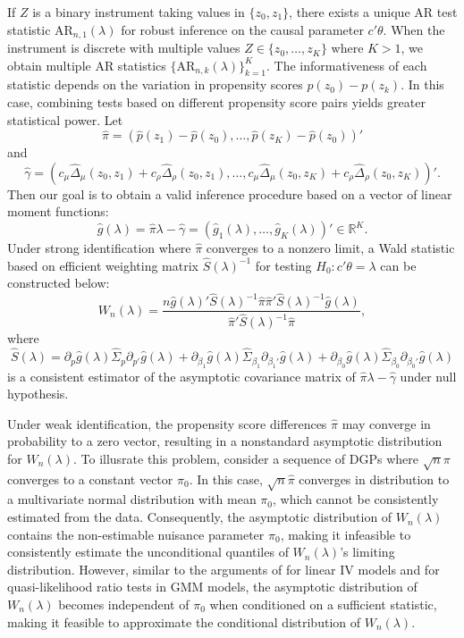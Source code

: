 \documentclass[11pt]{article}
\theoremstyle{definition}
\newcommand{\R}{\ensuremath{\mathbb{R}}}
\newcommand{\0}{\ensuremath{\mathbf{0}}}
\begin{document}
\begin{bibunit}
If $Z$ is a binary instrument taking values in $\{z_0, z_1\}$, there exists a unique AR test statistic $\text{AR}_{n,1}(\lambda)$ for robust inference on the causal parameter $c'\theta$. When the instrument is discrete with multiple values $Z\in\{z_0, \ldots, z_K\}$ where $K > 1$, we obtain multiple AR statistics $\{\text{AR}_{n,k}(\lambda)\}_{k=1}^K$. The informativeness of each statistic depends on the variation in propensity scores $p(z_0) - p(z_k)$. In this case, combining tests based on different propensity score pairs yields greater statistical power. Let 
\[
    \hat{\pi} = (\hat{p}(z_1) - \hat{p}(z_0), \ldots, \hat{p}(z_K) - \hat{p}(z_0))'
\]
and
\[
   \hat{\gamma} = (c_\mu \hat{\Delta}_\mu(z_0, z_1) + c_\rho \hat{\Delta}_\rho (z_0, z_1), \ldots, c_\mu \hat{\Delta}_\mu(z_0, z_K) + c_\rho \hat{\Delta}_\rho (z_0, z_K))'.
\]
Then our goal is to obtain a valid inference procedure based on a vector of linear moment functions: 
\[
    \hat{g}(\lambda)  = \hat{\pi}\lambda - \hat{\gamma} = (\hat{g}_1(\lambda), \ldots, \hat{g}_K(\lambda))' \in \R^K.
\]
Under strong identification where $\hat{\pi}$ converges to a nonzero limit, a Wald statistic based on efficient weighting matrix $\hat{S}(\lambda)^{-1}$ for testing $H_0: c'\theta = \lambda$ can be constructed below:
\[
    W_n(\lambda) = \frac{n\hat{g}(\lambda)'\hat{S}(\lambda)^{-1}\hat{\pi}\hat{\pi}'\hat{S}(\lambda)^{-1}\hat{g}(\lambda)}{\hat{\pi}'\hat{S}(\lambda)^{-1}\hat{\pi}},
\]
where 
\[
    \hat{S}(\lambda) = \partial_{p}\hat{g}(\lambda) \hat{\Sigma}_p \partial_{p'}\hat{g}(\lambda) + \partial_{\beta_1}\hat{g}(\lambda) \hat{\Sigma}_{\beta_1}\partial_{\beta_1'}\hat{g}(\lambda) +  
    \partial_{\beta_0}\hat{g}(\lambda) \hat{\Sigma}_{\beta_0}\partial_{\beta_0'}\hat{g}(\lambda)
\]
is a consistent estimator of the asymptotic covariance matrix of $\hat{\pi}\lambda - \hat{\gamma}$ under null hypothesis.

Under weak identification, the propensity score differences $\hat{\pi}$ may converge in probability to a zero vector, resulting in a nonstandard asymptotic distribution for $W_n(\lambda)$. To illusrate this problem, consider a sequence of DGPs where $\sqrt{n}\pi$ converges to a constant vector $\pi_0$. In this case, $\sqrt{n}\hat{\pi}$ converges in distribution to a multivariate normal distribution with mean $\pi_0$, which cannot be consistently estimated from the data. Consequently, the asymptotic distribution of $W_n(\lambda)$ contains the non-estimable nuisance parameter $\pi_0$, making it infeasible to consistently estimate the unconditional quantiles of $W_n(\lambda)$'s limiting distribution. However, similar to the arguments of \cite{moreira:2003} for linear IV models and \cite{andrews/mikusheva:2016b} for quasi-likelihood ratio tests in GMM models, the asymptotic distribution of $W_n(\lambda)$ becomes independent of $\pi_0$ when conditioned on a sufficient statistic, making it feasible to approximate the conditional distribution of $W_n(\lambda)$.


\end{bibunit}
\end{document}
